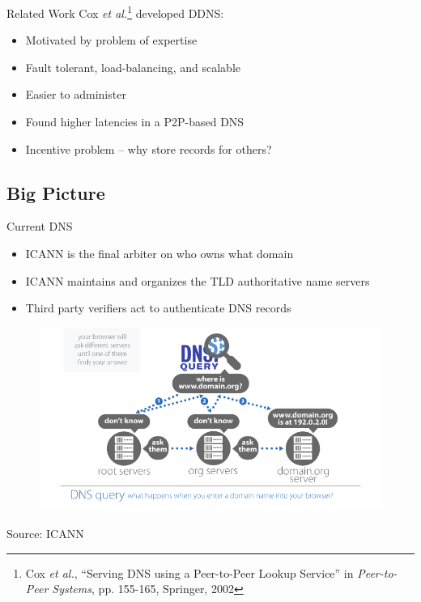 \documentclass[11pt]{beamer}
\begin{document}
\begin{frame}{Related Work}
	Cox \textit{et al.}\footnote{Cox \textit{et al.}, ``Serving DNS using a Peer-to-Peer Lookup Service'' in \textit{Peer-to-Peer Systems}, pp. 155-165, Springer, 2002 } developed DDNS:
	\begin{itemize}
		\item Motivated by problem of expertise
		\item Fault tolerant, load-balancing, and scalable
		\item Easier to administer
		\item Found higher latencies in a P2P-based DNS
		\item Incentive problem --  why store records for others?
	\end{itemize}
\end{frame}

\subsection{Big Picture}

\begin{frame}{Current DNS}
	\begin{itemize}
		\item ICANN is the final arbiter on who owns what domain
		\item ICANN maintains and organizes the TLD authoritative name servers
		\item Third party verifiers act to authenticate DNS records 
	\end{itemize}

\begin{figure}
\centering
\includegraphics[width=0.6\linewidth]{figs/dns}
\label{fig:dns}
\end{figure}
\begin{center}
\footnotesize{Source: ICANN}
	
\end{center}

\end{frame}
\end{document}
